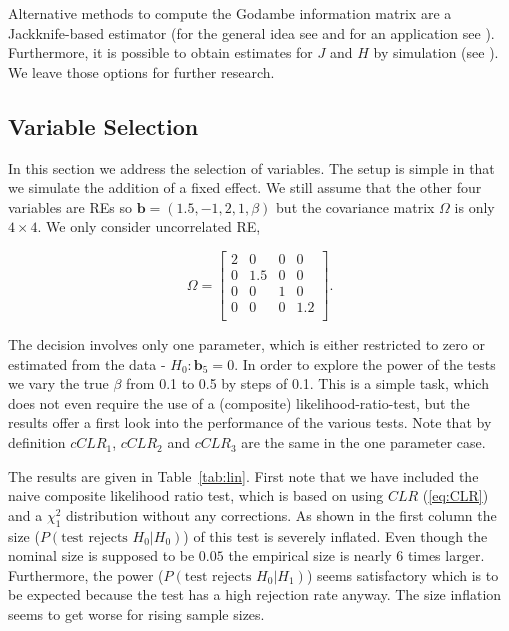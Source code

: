 \documentclass[12pt, a4paper]{article}
\numberwithin{defcounter}{section}
\numberwithin{excounter}{section}
\begin{document}
Alternative methods to compute the Godambe information matrix are a Jackknife-based estimator (for the general idea see \cite[p. 302ff]{joe1997} and for an application see \cite{zhao2005}). Furthermore, it is possible to obtain estimates for $J$ and $H$ by simulation (see \cite{cattelan2016}). We leave those options for further research.


\subsection{Variable Selection}

\label{chap:select}
In this section we address the selection of variables. The setup is simple in that we simulate the addition of a fixed effect. We still assume that the other four variables are \ac{RE}s so $\textbf{b} = (1.5, -1, 2, 1, \beta)$ but the covariance matrix $\Omega$ is only $4 \times 4$. We only consider uncorrelated \ac{RE},

\begin{equation*}
\Omega=
\begin{bmatrix}
 2 & 0 & 0 & 0 \\
0 & 1.5 & 0 & 0\\
0 & 0 & 1 & 0\\
0 & 0 & 0 & 1.2\\
\end{bmatrix}.
\end{equation*}



The decision involves only one parameter, which is either restricted to zero or estimated from the data - $H_0: \textbf{b}_5 = 0$. In order to explore the power of the tests we vary the true $\beta$ from 0.1 to 0.5 by steps of 0.1. This is a simple task, which does not even require the use of a (composite) likelihood-ratio-test, but the results offer a first look into the performance of the various tests. Note that by definition $cCLR_1$, $cCLR_2$  and $cCLR_3$ are the same in the one parameter case.



The results are given in Table~\ref{tab:lin}. First note that we have included the naive composite likelihood ratio test, which is based on using $CLR$ (\ref{eq:CLR}) and a $\chi^2_1$ distribution without any corrections. As shown in the first column the size ($P(\text{test rejects } H_0| H_0)$) of this test is severely inflated. Even though the nominal size is supposed to be $0.05$ the empirical size is nearly 6 times larger. Furthermore, the power ($P(\text{test rejects } H_0| H_1)$) seems satisfactory which is to be expected because the test has a high rejection rate anyway. The size inflation seems to get worse for rising sample sizes.
\end{document}

